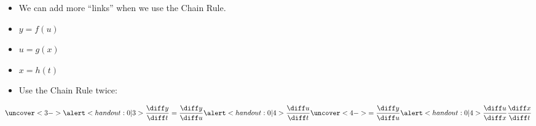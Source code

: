 \begin{frame}
\begin{itemize}
\item  We can add more ``links'' when we use the Chain Rule.
\item<2-| alert@3>  $y = f(u)$
\item<2-| alert@4>  $u = g(x)$
\item<2-| alert@4>  $x = h(t)$
\item<3->  Use the Chain Rule twice:
\end{itemize}
\[
\uncover<3->{%
\alert<handout:0| 3>{\frac{\diff y}{\diff t} = \frac{\diff y}{\diff u}\alert<handout:0| 4>{\frac{\diff u}{\diff t}}}%
}%
\uncover<4->{%
 = \frac{\diff y}{\diff u}\alert<handout:0| 4>{\frac{\diff u}{\diff x}\frac{\diff x}{\diff t}}%
}%
\]
\end{frame}
